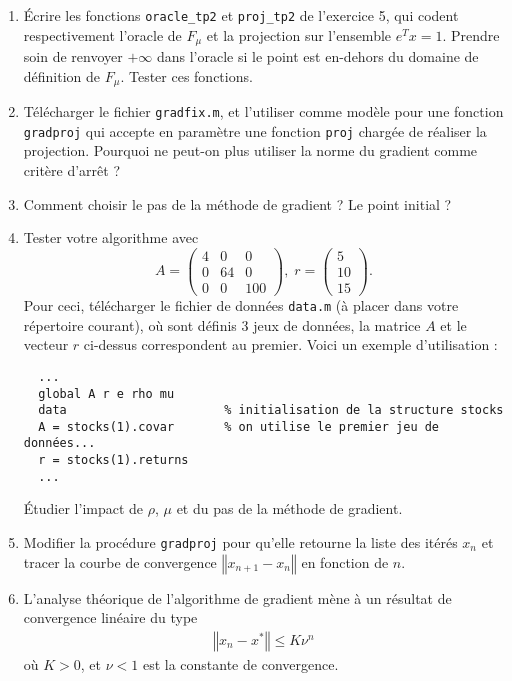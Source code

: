 \documentclass[10pt,a4paper,fleqn]{report}
\begin{document}
\begin{enumerate}
\item Écrire les fonctions \verb+oracle_tp2+ et \verb+proj_tp2+ de
  l'exercice 5, qui codent respectivement l'oracle de $F_{\mu}$ et la projection sur
  l'ensemble $e^{T} x = 1$. Prendre soin de renvoyer $+\infty$ dans
  l'oracle si le point est en-dehors du domaine de définition de
  $F_{\mu}$. Tester ces fonctions.
\item Télécharger le fichier \verb+gradfix.m+, et l'utiliser comme
  modèle pour une fonction \verb+gradproj+ qui accepte en paramètre
  une fonction \verb+proj+ chargée de réaliser la projection.
  Pourquoi ne peut-on plus utiliser la norme du gradient comme critère d'arrêt ?
\item Comment choisir le pas de la méthode de gradient ? Le point
  initial ?
\item Tester votre algorithme avec
    \[A =
  \begin{pmatrix}
    4&0&0\\0&64&0\\0&0&100
  \end{pmatrix},\;r =
  \begin{pmatrix}
    5\\10\\15
  \end{pmatrix}.\]
  Pour ceci, télécharger le fichier de données \verb+data.m+ (à placer dans votre répertoire
  courant), où sont définis 3 jeux de données, la matrice $A$ et le vecteur $r$ ci-dessus
  correspondent au premier. Voici un exemple d'utilisation :
  \begin{verbatim}
  ...
  global A r e rho mu
  data                      % initialisation de la structure stocks
  A = stocks(1).covar       % on utilise le premier jeu de données...
  r = stocks(1).returns
  ...
  \end{verbatim}

  Étudier l'impact de $\rho$, $\mu$ et du pas de la méthode de
  gradient.
\item Modifier la procédure \verb+gradproj+ pour qu'elle retourne la
  liste des itérés $x_{n}$ et tracer la courbe de convergence
  $\left\Vert x_{n+1} - x_{n}\right\Vert$ en fonction de $n$.
\item L'analyse théorique de l'algorithme de gradient mène à un
  résultat de convergence linéaire du type
  \begin{align*}
    \left\Vert x_{n} - x^{*}\right\Vert \leq K \nu^{n}
  \end{align*}
  où $K > 0$, et $\nu < 1$ est la constante de convergence.


\end{enumerate}
\end{document}
